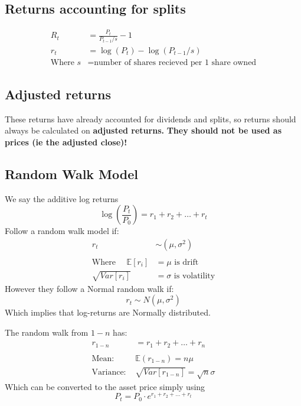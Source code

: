 \documentclass[
  oneside]{book}
\begin{document}
\hypertarget{returns-accounting-for-splits}{%
\subsection{Returns accounting for splits}\label{returns-accounting-for-splits}}

\[
\begin{aligned}
R_{t} &= \frac{P_{t}}{P_{t-1}/s}-1\\
r_{t} &= \log(P_{t}) - \log(P_{t-1}/s)\\
\text{Where } s &= \text{number of shares recieved per 1 share owned}
\end{aligned}
\]

\hypertarget{adjusted-returns}{%
\subsection{Adjusted returns}\label{adjusted-returns}}

These returns have already accounted for dividends and splits, so returns should always be calculated on \textbf{adjusted returns.}
\textbf{They should not be used as prices (ie the adjusted close)!}

\hypertarget{random-walk-model}{%
\subsection{Random Walk Model}\label{random-walk-model}}

We say the additive log returns
\[
\log\left( \frac{P_{t}}{P_{0}} \right) = r_{1} + r_{2} + \dots + r_{t}
\]
Follow a random walk model if:
\[
\begin{aligned}
r_{t} &\sim (\mu, \sigma^{2})\\
\\
\text{Where } \quad  \mathbb{E}[r_{i}] &= \mu \text{ is drift}\\
 \sqrt{ Var[r_{i}] } &= \sigma \text{ is volatility}
\end{aligned}
\]
However they follow a Normal random walk if:
\[
r_{t} \sim N(\mu, \sigma^{2})
\]
Which implies that log-returns are Normally distributed.

The random walk from \(1-n\) has:
\[
\begin{aligned}
r_{1-n} &= r_1 + r_{2} + \dots +r_{n}\\
\\
\text{Mean: }& \mathbb{E}(r_{1-n}) = n\mu\\
\text{Variance: }& \sqrt{ Var[r_{1-n}] } = \sqrt{ n }\sigma
\end{aligned}
\]
Which can be converted to the asset price simply using
\[
P_{t} = P_{0}\cdot e^{r_{1} + r_{2}+\dots +r_{t}}
\]
\end{document}
